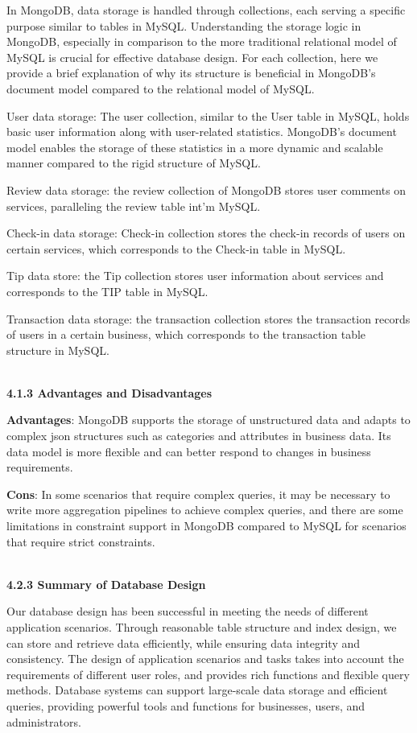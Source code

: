 \documentclass[runningheads]{llncs}
\begin{document}
In MongoDB, data storage is handled through collections, each serving a specific purpose similar to tables in MySQL. Understanding the storage logic in MongoDB, especially in comparison to the more traditional relational model of MySQL is crucial for effective database design. For each collection, here we provide a brief explanation of why its structure is beneficial in MongoDB’s document model compared to the relational model of MySQL.

User data storage: The user collection, similar to the User table in MySQL, holds basic user information along with user-related statistics. MongoDB’s document model enables the storage of these statistics in a more dynamic and scalable manner compared to the rigid structure of MySQL.

Review data storage: the review collection of MongoDB stores user comments on services, paralleling the review table int'm MySQL.

Check-in data storage: Check-in collection stores the check-in records of users on certain services, which corresponds to the Check-in table in MySQL.

Tip data store: the Tip collection stores user information about services and corresponds to the TIP table in MySQL.

Transaction data storage: the transaction collection stores the transaction records of users in a certain business, which corresponds to the transaction table structure in MySQL.

\textbf{\\4.1.3 Advantages and Disadvantages\\}

\textbf{Advantages}: MongoDB supports the storage of unstructured data and adapts to complex json structures such as categories and attributes in business data. Its data model is more flexible and can better respond to changes in business requirements.

\textbf{Cons}: In some scenarios that require complex queries, it may be necessary to write more aggregation pipelines to achieve complex queries, and there are some limitations in constraint support in MongoDB compared to MySQL for scenarios that require strict constraints.

\textbf{\\4.2.3 Summary of Database Design\\}

Our database design has been successful in meeting the needs of different application scenarios. Through reasonable table structure and index design, we can store and retrieve data efficiently, while ensuring data integrity and consistency. The design of application scenarios and tasks takes into account the requirements of different user roles, and provides rich functions and flexible query methods. Database systems can support large-scale data storage and efficient queries, providing powerful tools and functions for businesses, users, and administrators.
\end{document}
